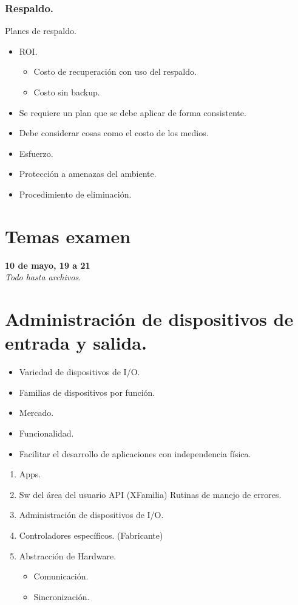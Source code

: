 \section{Respaldo.}
Planes de respaldo.
\begin{itemize}
	\item ROI.
	\begin{itemize}
		\item Costo de recuperaci\'{o}n con uso del respaldo.
		\item Costo sin backup.
	\end{itemize}
	\item Se requiere un plan que se debe aplicar de forma consistente.
	\item Debe considerar cosas como el costo de los medios.
	\item Esfuerzo.
	\item Protecci\'{o}n a amenazas del ambiente.
	\item Procedimiento de eliminaci\'{o}n.
\end{itemize}
\part{Temas examen}
\textbf{10 de mayo, 19 a 21}\\
\textit{Todo hasta archivos.}\\

\part{Administraci\'{o}n de dispositivos de entrada y salida.}
\begin{itemize}
	\item Variedad de dispositivos de I/O.
	\item Familias de dispositivos por funci\'{o}n.
	\item Mercado.
	\item Funcionalidad.
	\item Facilitar el desarrollo de aplicaciones con independencia f\'{i}sica.
\end{itemize}

\begin{enumerate}
	\item Apps.
	\item Sw del \'{a}rea del usuario API (XFamilia) Rutinas de manejo de errores.
	\item Administraci\'{o}n de dispositivos de I/O.
	\item Controladores espec\'{i}ficos. (Fabricante)
	\item Abstracci\'{o}n de Hardware.
		\begin{itemize}
			\item Comunicaci\'{o}n.
			\item Sincronizaci\'{o}n.
		\end{itemize}
\end{enumerate}

